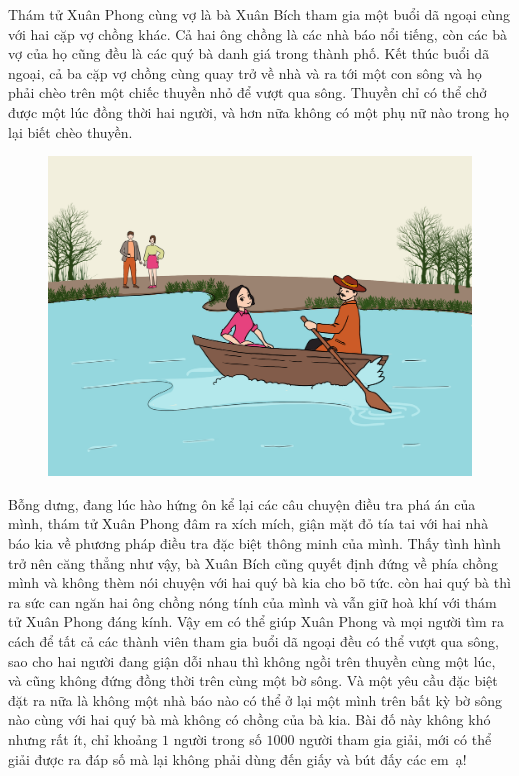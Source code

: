\begin{multicols}{2}
	Thám tử Xuân Phong cùng vợ là bà Xuân Bích tham gia một buổi dã ngoại cùng với hai cặp vợ chồng khác. Cả hai ông chồng là các nhà báo nổi tiếng, còn các bà vợ của họ cũng đều là các quý bà danh giá trong thành phố. Kết thúc buổi dã ngoại, cả ba cặp vợ chồng cùng quay trở về nhà và ra tới một con sông và họ phải chèo trên một chiếc thuyền nhỏ để vượt qua sông. Thuyền chỉ có thể chở được một lúc đồng thời hai người, và hơn nữa không có một phụ nữ nào trong họ lại biết chèo thuyền.
	\begin{figure}[H]
		\centering
		\vspace*{-5pt}
		\captionsetup{labelformat= empty, justification=centering}
		\includegraphics[width=1\linewidth]{xuanphong}
		\vspace*{-15pt}
	\end{figure}
	Bỗng dưng, đang lúc hào hứng ôn kể lại các câu chuyện điều tra phá án của mình, thám tử Xuân Phong đâm ra xích mích, giận mặt đỏ tía tai với hai nhà báo kia về phương pháp điều tra đặc biệt thông minh của mình. Thấy tình hình trở nên căng thẳng như vậy, bà Xuân Bích cũng quyết định đứng về phía chồng mình và không thèm nói chuyện với hai quý bà kia cho bõ tức. còn hai quý bà thì ra sức can ngăn hai ông chồng nóng tính của mình và vẫn giữ hoà khí với thám tử Xuân Phong đáng kính.
	\vskip 0.1cm
	Vậy em có thể giúp Xuân Phong và mọi người tìm ra cách để tất cả các thành viên tham gia buổi dã ngoại đều có thể vượt qua sông, sao cho hai người đang giận dỗi nhau thì không ngồi trên thuyền cùng một lúc, và cũng không đứng đồng thời trên cùng một bờ sông. Và một yêu cầu đặc biệt đặt ra nữa là không một nhà báo nào có thể ở lại một mình trên bất kỳ bờ sông nào cùng với hai quý bà mà không có chồng của bà kia. 
	\vskip 0.1cm
	Bài đố này không khó nhưng rất ít, chỉ khoảng $1$ người trong số $1000$ người tham gia giải, mới có thể giải được ra đáp số mà lại không phải dùng đến giấy và bút đấy các em~ạ!
	
\end{multicols}
